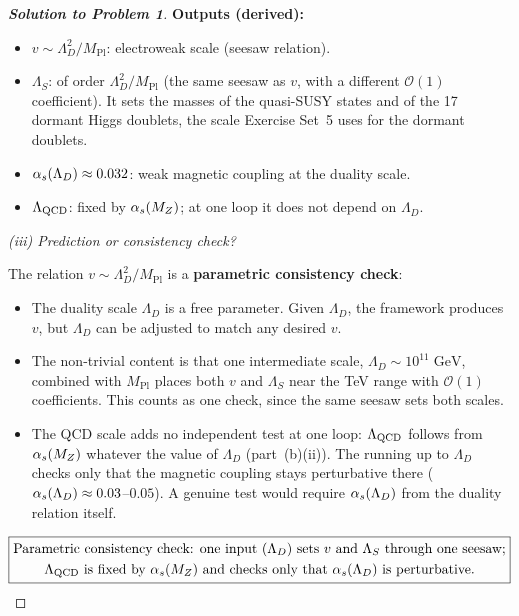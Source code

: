\documentclass[11pt,a4paper]{article}
\begin{document}
\begin{proof}[\textbf{Solution to Problem 1}]
\textbf{Outputs (derived):}
\begin{itemize}
  \item $v \sim \Lambda_D^2/M_{\text{Pl}}$: electroweak scale (seesaw
    relation).
  \item $\Lambda_S$: of order $\Lambda_D^2/M_{\text{Pl}}$ (the same
    seesaw as $v$, with a different $\mathcal{O}(1)$ coefficient).  It
    sets the masses of the quasi-SUSY states and of the 17 dormant Higgs
    doublets, the scale Exercise Set~5 uses for the dormant doublets.
  \item $\alpha_s(\Lambda_D) \approx 0.032$: weak magnetic coupling at
    the duality scale.
  \item $\Lambda_{\mathrm{QCD}}$: fixed by $\alpha_s(M_Z)$; at one loop it does
    not depend on $\Lambda_D$.
\end{itemize}

\textit{(iii) Prediction or consistency check?}

The relation $v \sim \Lambda_D^2/M_{\text{Pl}}$ is a
\textbf{parametric consistency check}:
\begin{itemize}
  \item The duality scale $\Lambda_D$ is a free parameter.  Given
    $\Lambda_D$, the framework produces $v$, but $\Lambda_D$ can be
    adjusted to match any desired $v$.
  \item The non-trivial content is that one intermediate scale,
    $\Lambda_D \sim 10^{11}\;\text{GeV}$, combined with $M_{\text{Pl}}$
    places both $v$ and $\Lambda_S$ near the TeV range with
    $\mathcal{O}(1)$ coefficients.  This counts as one check, since the
    same seesaw sets both scales.
  \item The QCD scale adds no independent test at one loop:
    $\Lambda_{\mathrm{QCD}}$ follows from $\alpha_s(M_Z)$ whatever the value of
    $\Lambda_D$ (part~(b)(ii)).  The running up to $\Lambda_D$ checks
    only that the magnetic coupling stays perturbative there
    ($\alpha_s(\Lambda_D) \approx 0.03$--$0.05$).  A genuine test would
    require $\alpha_s(\Lambda_D)$ from the duality relation itself.
\end{itemize}
\[
  \boxed{\begin{gathered}
  \text{Parametric consistency check: one input } (\Lambda_D)
  \text{ sets } v \text{ and } \Lambda_S \text{ through one seesaw;}\\
  \Lambda_{\mathrm{QCD}} \text{ is fixed by } \alpha_s(M_Z)
  \text{ and checks only that } \alpha_s(\Lambda_D) \text{ is perturbative.}
  \end{gathered}}
\]

\end{proof}
\end{document}
